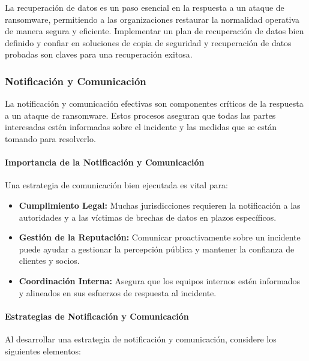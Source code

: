 La recuperación de datos es un paso esencial en la respuesta a un ataque de ransomware, permitiendo a las organizaciones restaurar la normalidad operativa de manera segura y eficiente. Implementar un plan de recuperación de datos bien definido y confiar en soluciones de copia de seguridad y recuperación de datos probadas son claves para una recuperación exitosa.



\subsubsection{Notificación y Comunicación}

La notificación y comunicación efectivas son componentes críticos de la respuesta a un ataque de ransomware. Estos procesos aseguran que todas las partes interesadas estén informadas sobre el incidente y las medidas que se están tomando para resolverlo.

\paragraph{Importancia de la Notificación y Comunicación}

Una estrategia de comunicación bien ejecutada es vital para:

\begin{itemize}
    \item \textbf{Cumplimiento Legal:} Muchas jurisdicciones requieren la notificación a las autoridades y a las víctimas de brechas de datos en plazos específicos.
    \item \textbf{Gestión de la Reputación:} Comunicar proactivamente sobre un incidente puede ayudar a gestionar la percepción pública y mantener la confianza de clientes y socios.
    \item \textbf{Coordinación Interna:} Asegura que los equipos internos estén informados y alineados en sus esfuerzos de respuesta al incidente.
\end{itemize}

\paragraph{Estrategias de Notificación y Comunicación}

Al desarrollar una estrategia de notificación y comunicación, considere los siguientes elementos:

